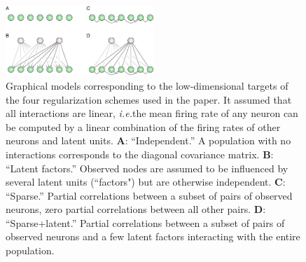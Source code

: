 \begin{figure}[htp]
\centering
\includegraphics[width=0.5\textwidth]{figures/Figure2.pdf}
\caption{
Graphical models corresponding to the low-dimensional targets of the four regularization schemes used in the paper. It assumed that all interactions are linear, \emph{i.e.}\;the mean firing rate of any neuron can be computed by a linear combination of the firing rates of other neurons and latent units.
\textbf{A}: ``Independent.'' A population with no interactions corresponds to the diagonal covariance matrix.
\textbf{B}: ``Latent factors.'' Observed nodes are assumed to be influenced by several latent units (``factors") but are otherwise independent.
\textbf{C}: ``Sparse.'' Partial correlations between a subset of pairs of observed neurons, zero partial correlations between all other pairs.  
\textbf{D}: ``Sparse+latent.''  Partial correlations between a subset of pairs of observed neurons and a few latent factors interacting with the entire population. 
}\label{fig:02}
\end{figure}
